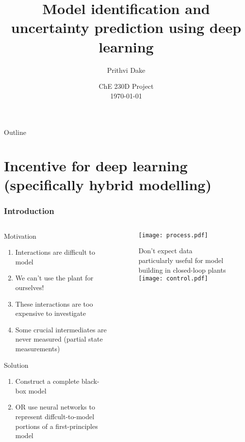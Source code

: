 \documentclass[dvipsnames, 9pt]{beamer}
\title[Model identification]{Model identification and uncertainty prediction using deep learning}
\author[ChE230D---Dake]{Prithvi Dake}
\institute [UCSB]{Department of Chemical
  Engineering\\
    \pgfuseimage{ucsb-logo}}
\date{ChE 230D Project \\
\today}
\begin{document}
\frame{\titlepage}




\begin{frame}{Outline} 
\tableofcontents
\end{frame}

\section{Incentive for deep learning (specifically hybrid modelling)}
\begin{frame}
    \frametitle{Introduction}
    
    \begin{columns}
    {   \begin{column}{0.45\textwidth}
        \begin{block}{Motivation}
        \begin{enumerate}
        \item Interactions are difficult to model
        \item We can't use the plant for ourselves!
        \item These interactions are too expensive to investigate
        \item Some crucial intermediates are never measured (partial state measurements)
        \end{enumerate}
\end{block}
\begin{block}{Solution}
\begin{enumerate}
\item Construct a complete black-box model
\item OR use neural networks to represent diffcult-to-model portions of a first-principles model
\end{enumerate}
\end{block}
        \end{column}}
        \begin{column}{0.55\textwidth}
            \begin{figure}

\texttt{[image: process.pdf]}

Don't expect data particularly useful for model building in closed-loop plants
\texttt{[image: control.pdf]}
 \end{figure}
        \end{column}
    \end{columns}
\end{frame}
\end{document}
